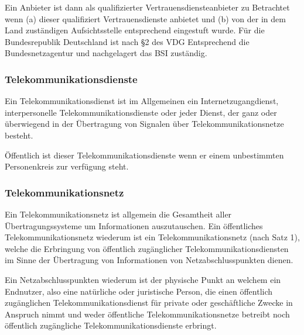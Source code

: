 \documentclass[11pt,a4paper]{article}   %
\begin{document}
            Ein Anbieter ist dann als qualifizierter Vertrauensdiensteanbieter zu Betrachtet wenn (a) dieser qualifiziert Vertrauensdienste anbietet und (b) von der in dem Land zuständigen Aufsichtsstelle entsprechend eingestuft wurde. Für die Bundesrepublik Deutschland ist nach §2 des VDG Entsprechend die Bundesnetzagentur und nachgelagert das BSI zuständig.

            \subsubsection{Telekommunikationsdienste}
            Ein Telekommunikationsdienst ist im Allgemeinen ein Internetzugangdienst, interpersonelle Telekommunikationsdienste oder jeder Dienst, der ganz oder überwiegend in der Übertragung von Signalen über Telekommunikationsnetze besteht.

            Öffentlich ist dieser Telekommunikationsdienste wenn er einem unbestimmten Personenkreis zur verfügung steht.

            \subsubsection{Telekommunikationsnetz}
            Ein Telekommunikationsnetz ist allgemein die Gesamtheit aller Übertragungssysteme um Informationen auszutauschen. Ein öffentliches Telekommunikationsnetz wiederum ist ein Telekommunikationsnetz (nach Satz 1), welche die Erbringung von öffentlich zugänglicher Telekommunikationsdiensten im Sinne der Übertragung von Informationen von Netzabschlusspunkten dienen. 

            Ein Netzabschlusspunkten wiederum ist der physische Punkt an welchem ein Endnutzer, also eine natürliche oder juristische Person, die einen öffentlich zugänglichen Telekommunikationsdienst für private oder geschäftliche Zwecke in Anspruch nimmt und weder öffentliche Telekommunikationsnetze betreibt noch öffentlich zugängliche Telekommunikationsdienste erbringt.
\end{document}

